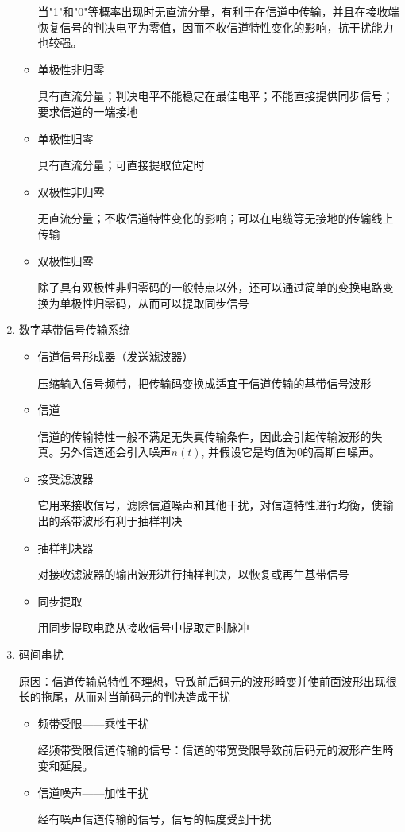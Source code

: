 \documentclass[UTF8]{ctexrep}
\begin{document}
\begin{enumerate}
\begin{itemize}
当"1"和"0"等概率出现时无直流分量，有利于在信道中传输，并且在接收端恢复信号的判决电平为零值，因而不收信道特性变化的影响，抗干扰能力也较强。
\item 单极性非归零\par
具有直流分量；判决电平不能稳定在最佳电平；不能直接提供同步信号；要求信道的一端接地
\item 单极性归零\par
具有直流分量；可直接提取位定时
\item 双极性非归零\par
无直流分量；不收信道特性变化的影响；可以在电缆等无接地的传输线上传输
\item 双极性归零\par
除了具有双极性非归零码的一般特点以外，还可以通过简单的变换电路变换为单极性归零码，从而可以提取同步信号
\end{itemize}
\item 数字基带信号传输系统
\begin{itemize}
\item 信道信号形成器（发送滤波器）\par
压缩输入信号频带，把传输码变换成适宜于信道传输的基带信号波形
\item 信道\par
信道的传输特性一般不满足无失真传输条件，因此会引起传输波形的失真。另外信道还会引入噪声$n(t)$, 并假设它是均值为0的高斯白噪声。
\item 接受滤波器\par
它用来接收信号，滤除信道噪声和其他干扰，对信道特性进行均衡，使输出的系带波形有利于抽样判决
\item 抽样判决器\par
对接收滤波器的输出波形进行抽样判决，以恢复或再生基带信号
\item 同步提取\par
用同步提取电路从接收信号中提取定时脉冲
\end{itemize}
\item 码间串扰\par
原因：信道传输总特性不理想，导致前后码元的波形畸变并使前面波形出现很长的拖尾，从而对当前码元的判决造成干扰
\begin{itemize}
\item 频带受限——乘性干扰\par
经频带受限信道传输的信号：信道的带宽受限导致前后码元的波形产生畸变和延展。
\item 信道噪声——加性干扰\par
经有噪声信道传输的信号，信号的幅度受到干扰
\end{itemize}

\end{enumerate}
\end{document}
